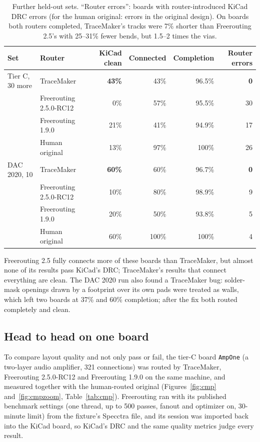 \documentclass[10pt,a4paper]{article}
\begin{document}
\begin{table}[h]
\centering
\small
\begin{tabular}{llrrrr}
\toprule
Set & Router & KiCad clean & Connected & Completion & Router errors \\
\midrule
Tier C, 30 more & TraceMaker & \textbf{43\%} & 43\% & 96.5\% & \textbf{0} \\
 & Freerouting 2.5.0-RC12 & 0\% & 57\% & 95.5\% & 30 \\
 & Freerouting 1.9.0 & 21\% & 41\% & 94.9\% & 17 \\
 & Human original & 13\% & 97\% & 100\% & 26 \\
\midrule
DAC 2020, 10 & TraceMaker & \textbf{60\%} & 60\% & 96.7\% & \textbf{0} \\
 & Freerouting 2.5.0-RC12 & 10\% & 80\% & 98.9\% & 9 \\
 & Freerouting 1.9.0 & 20\% & 50\% & 93.8\% & 5 \\
 & Human original & 60\% & 100\% & 100\% & 4 \\
\bottomrule
\end{tabular}
\caption{Further held-out sets. ``Router errors'': boards with router-introduced KiCad DRC errors (for the human
original: errors in the original design). On boards both routers completed, TraceMaker's tracks were 7\% shorter
than Freerouting 2.5's with 25--31\% fewer bends, but 1.5--2 times the vias.}
\label{tab:quality2}
\end{table}

\noindent Freerouting 2.5 fully connects more of these boards than TraceMaker, but almost none of its results pass
KiCad's DRC; TraceMaker's results that connect everything are clean. The DAC 2020 run also found a TraceMaker bug:
solder-mask openings drawn by a footprint over its own pads were treated as walls, which left two boards at 37\% and
60\% completion; after the fix both routed completely and clean.

\subsection{Head to head on one board}
\label{sec:h2h-board}

To compare layout quality and not only pass or fail, the tier-C board \texttt{AmpOne} (a two-layer audio amplifier,
321 connections) was routed by TraceMaker, Freerouting 2.5.0-RC12 and Freerouting 1.9.0 on the same machine, and measured together
with the human-routed original (Figures~\ref{fig:cmp} and~\ref{fig:cmpzoom}, Table~\ref{tab:cmp}). Freerouting ran
with its published benchmark settings (one thread, up to 500 passes, fanout and optimizer on, 30-minute limit) from
the fixture's Specctra file, and its session was imported back into the KiCad board, so KiCad's DRC and the same
quality metrics judge every result.
\end{document}
